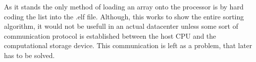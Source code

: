 As it stands the only method of loading an array onto the processor is by hard
coding the list into the .elf file. Although, this works to show the entire
sorting algorithm, it would not be usefull in an actual datacenter unless some
sort of communication protocol is established between the host CPU and the
computational storage device. This communication is left as a problem, that
later has to be solved.




